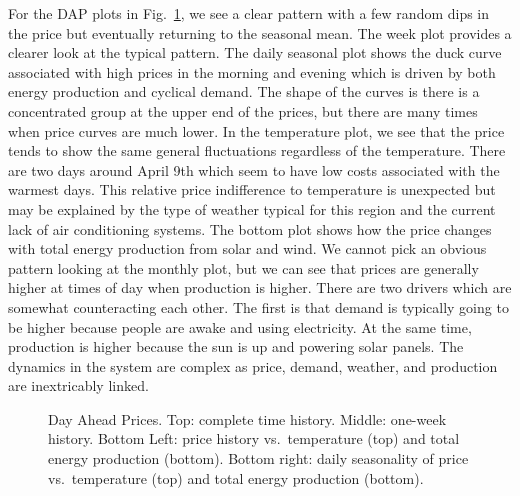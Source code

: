 \documentclass[
  journal,
]{IEEEtran}%
\begin{document}
For the DAP plots in Fig.~\ref{fig-monthly-dap-energy-price-plots}, we
see a clear pattern with a few random dips in the price but eventually
returning to the seasonal mean. The week plot provides a clearer look at
the typical pattern. The daily seasonal plot shows the duck curve
associated with high prices in the morning and evening which is driven
by both energy production and cyclical demand. The shape of the curves
is there is a concentrated group at the upper end of the prices, but
there are many times when price curves are much lower. In the
temperature plot, we see that the price tends to show the same general
fluctuations regardless of the temperature. There are two days around
April 9th which seem to have low costs associated with the warmest days.
This relative price indifference to temperature is unexpected but may be
explained by the type of weather typical for this region and the current
lack of air conditioning systems. The bottom plot shows how the price
changes with total energy production from solar and wind. We cannot pick
an obvious pattern looking at the monthly plot, but we can see that
prices are generally higher at times of day when production is higher.
There are two drivers which are somewhat counteracting each other. The
first is that demand is typically going to be higher because people are
awake and using electricity. At the same time, production is higher
because the sun is up and powering solar panels. The dynamics in the
system are complex as price, demand, weather, and production are
inextricably linked.

\begin{figure}


\caption{\label{fig-monthly-dap-energy-price-plots}Day Ahead Prices.
Top: complete time history. Middle: one-week history. Bottom Left: price
history vs.~temperature (top) and total energy production (bottom).
Bottom right: daily seasonality of price vs.~temperature (top) and total
energy production (bottom).}

\end{figure}%
\end{document}
